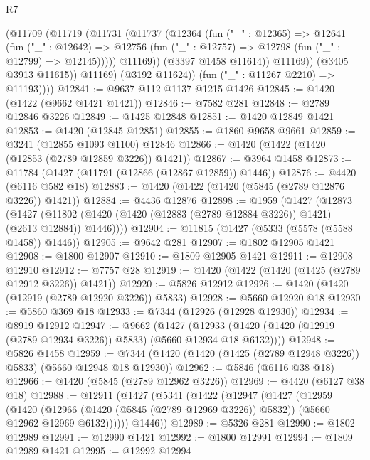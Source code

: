 \begin{lexlean}{R7}
\begin{coremodule}
                  (@11709
                    (@11719
                      (@11731
                        (@11737
                          (@12364
                            (fun ("_" : @12365) =>
                            @12641
                              (fun ("_" : @12642) =>
                              @12756
                                (fun ("_" : @12757) => @12798 (fun ("_" : @12799) => @12145)))))
                          @11169))
                      (@3397 @1458 @11614))
                    @11169))
                (@3405 @3913 @11615))
              @11169)
            (@3192 @11624))
          (fun ("_" : @11267 @2210) => @11193))))
@12841 := @9637 @112 @1137 @1215 @1426
@12845 := @1420 (@1422 (@9662 @1421 @1421))
@12846 := @7582 @281
@12848 := @2789 @12846 @3226
@12849 := @1425 @12848
@12851 := @1420 @12849 @1421
@12853 := @1420 (@12845 @12851)
@12855 := @1860 @9658 @9661
@12859 := @3241 (@12855 @1093 @1100) @12846
@12866 := @1420 (@1422 (@1420 (@12853 (@2789 @12859 @3226)) @1421))
@12867 := @3964 @1458
@12873 := @11784 (@1427 (@11791 (@12866 (@12867 @12859)) @1446))
@12876 := @4420 (@6116 @582 @18)
@12883 := @1420 (@1422 (@1420 (@5845 (@2789 @12876 @3226)) @1421))
@12884 := @4436 @12876
@12898 := @1959
    (@1427
      (@12873
        (@1427 (@11802 (@1420 (@1420 (@12883 (@2789 @12884 @3226)) @1421) (@2613 @12884)) @1446))))
@12904 := @11815 (@1427 (@5333 (@5578 (@5588 @1458)) @1446))
@12905 := @9642 @281
@12907 := @1802 @12905 @1421
@12908 := @1800 @12907
@12910 := @1809 @12905 @1421
@12911 := @12908 @12910
@12912 := @7757 @28
@12919 := @1420 (@1422 (@1420 (@1425 (@2789 @12912 @3226)) @1421))
@12920 := @5826 @12912
@12926 := @1420 (@1420 (@12919 (@2789 @12920 @3226)) @5833)
@12928 := @5660 @12920 @18
@12930 := @5860 @369 @18
@12933 := @7344 (@12926 (@12928 @12930))
@12934 := @8919 @12912
@12947 := @9662
    (@1427 (@12933 (@1420 (@1420 (@12919 (@2789 @12934 @3226)) @5833) (@5660 @12934 @18 @6132))))
@12948 := @5826 @1458
@12959 := @7344 (@1420 (@1420 (@1425 (@2789 @12948 @3226)) @5833) (@5660 @12948 @18 @12930))
@12962 := @5846 (@6116 @38 @18)
@12966 := @1420 (@5845 (@2789 @12962 @3226))
@12969 := @4420 (@6127 @38 @18)
@12988 := @12911
    (@1427
      (@5341
        (@1422
          (@12947
            (@1427
              (@12959
                (@1420
                  (@12966 (@1420 (@5845 (@2789 @12969 @3226)) @5832))
                  (@5660 @12962 @12969 @6132))))))
        @1446))
@12989 := @5326 @281
@12990 := @1802 @12989
@12991 := @12990 @1421
@12992 := @1800 @12991
@12994 := @1809 @12989 @1421
@12995 := @12992 @12994

\end{coremodule}
\end{lexlean}
